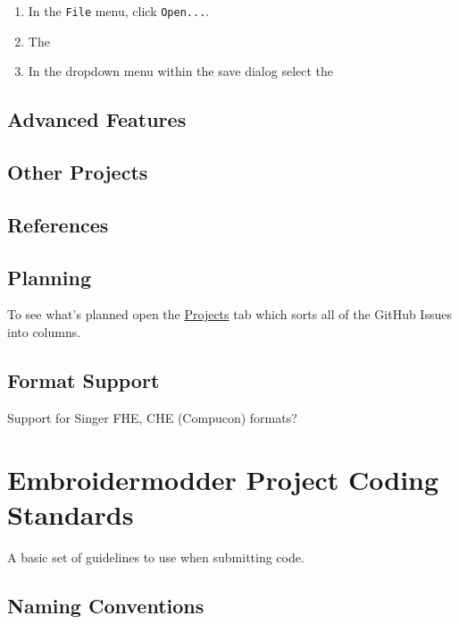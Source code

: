 \documentclass[a4paper, 11pt]{report}
\begin{document}
\begin{enumerate}
\def\labelenumi{\arabic{enumi}.}
\item
  In the \texttt{File} menu, click \texttt{Open...}.
\item
  The
\item
  In the dropdown menu within the save dialog select the
\end{enumerate}

\hypertarget{advanced-features-1}{%
\subsection{Advanced Features}\label{advanced-features-1}}

\hypertarget{other-projects-1}{%
\subsection{Other Projects}\label{other-projects-1}}

\hypertarget{references-1}{%
\subsection{References}\label{references-1}}

\hypertarget{planning}{%
\subsection{Planning}\label{planning}}

To see what's planned open the
\href{https://github.com/Embroidermodder/Embroidermodder/projects/1}{Projects}
tab which sorts all of the GitHub Issues into columns.

\hypertarget{format-support}{%
\subsection{Format Support}\label{format-support}}

Support for Singer FHE, CHE (Compucon) formats?

\hypertarget{embroidermodder-project-coding-standards}{%
\section{Embroidermodder Project Coding
Standards}\label{embroidermodder-project-coding-standards}}

A basic set of guidelines to use when submitting code.

\hypertarget{naming-conventions}{%
\subsection{Naming Conventions}\label{naming-conventions}}
\end{document}
